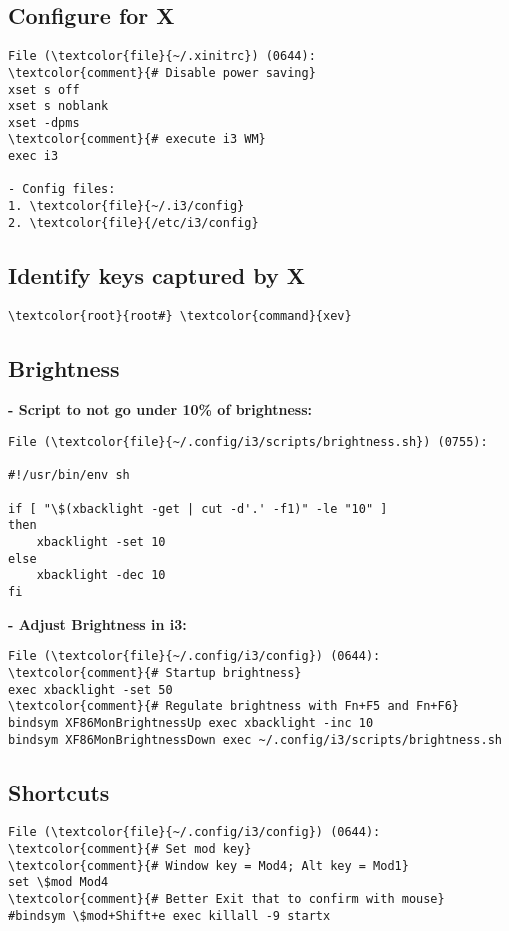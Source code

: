 \documentclass[10pt, a4paper, onecolumn, openany]{book}         %
\begin{document}
\subsection{Configure for X}
\begin{Verbatim}[commandchars=\\\{\}]
File (\textcolor{file}{~/.xinitrc}) (0644):
\textcolor{comment}{# Disable power saving}
xset s off
xset s noblank
xset -dpms
\textcolor{comment}{# execute i3 WM}
exec i3

- Config files:
1. \textcolor{file}{~/.i3/config}
2. \textcolor{file}{/etc/i3/config}
\end{Verbatim}

\subsection{Identify keys captured by X}
\begin{Verbatim}[commandchars=\\\{\}]
    \textcolor{root}{root#} \textcolor{command}{xev}
\end{Verbatim}

\subsection{Brightness}


\textbf{- Script to not go under 10\% of brightness:}
\begin{Verbatim}[commandchars=\\\{\}]
File (\textcolor{file}{~/.config/i3/scripts/brightness.sh}) (0755):

#!/usr/bin/env sh

if [ "\$(xbacklight -get | cut -d'.' -f1)" -le "10" ]
then
    xbacklight -set 10
else
    xbacklight -dec 10
fi
\end{Verbatim}
\textbf{- Adjust Brightness in i3:}
\begin{Verbatim}[commandchars=\\\{\}]
File (\textcolor{file}{~/.config/i3/config}) (0644):
\textcolor{comment}{# Startup brightness}
exec xbacklight -set 50
\textcolor{comment}{# Regulate brightness with Fn+F5 and Fn+F6}
bindsym XF86MonBrightnessUp exec xbacklight -inc 10
bindsym XF86MonBrightnessDown exec ~/.config/i3/scripts/brightness.sh
\end{Verbatim}

\subsection{Shortcuts}
\begin{Verbatim}[commandchars=\\\{\}]
File (\textcolor{file}{~/.config/i3/config}) (0644):
\textcolor{comment}{# Set mod key}
\textcolor{comment}{# Window key = Mod4; Alt key = Mod1}
set \$mod Mod4
\textcolor{comment}{# Better Exit that to confirm with mouse}
#bindsym \$mod+Shift+e exec killall -9 startx
\end{Verbatim}
\end{document}
